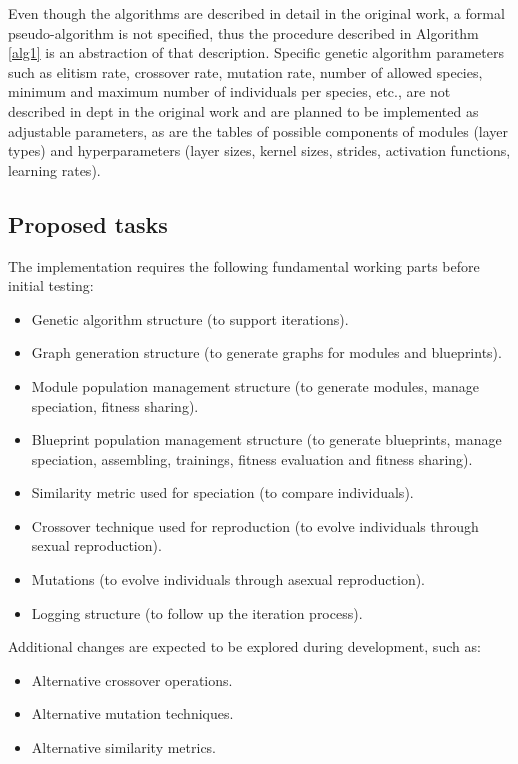 \documentclass[12pt]{article}
\begin{document}
Even though the algorithms are described in detail in the original work, a formal pseudo-algorithm is not specified, thus the procedure described in Algorithm \ref{alg1} is an abstraction of that description. Specific genetic algorithm parameters such as elitism rate, crossover rate, mutation rate, number of allowed species, minimum and maximum number of individuals per species, etc., are not described in dept in the original work and are planned to be implemented as adjustable parameters, as are the tables of possible components of modules (layer types) and hyperparameters (layer sizes, kernel sizes, strides, activation functions, learning rates).

\subsection{Proposed tasks}

The implementation requires the following fundamental working parts before initial testing:
    \begin{itemize}
        \item Genetic algorithm structure (to support iterations).
        \item Graph generation structure (to generate graphs for modules and blueprints).
        \item Module population management structure (to generate modules, manage speciation, fitness sharing).
        \item Blueprint population management structure (to generate blueprints, manage speciation, assembling, trainings, fitness evaluation and fitness sharing).
        \item Similarity metric used for speciation (to compare individuals).
        \item Crossover technique used for reproduction (to evolve individuals through sexual reproduction).
        \item Mutations (to evolve individuals through asexual reproduction).
        \item Logging structure (to follow up the iteration process).
    \end{itemize}
    
Additional changes are expected to be explored during development, such as:
    \begin{itemize}
        \item Alternative crossover operations.
        \item Alternative mutation techniques.
        \item Alternative similarity metrics.
    \end{itemize}
\end{document}
